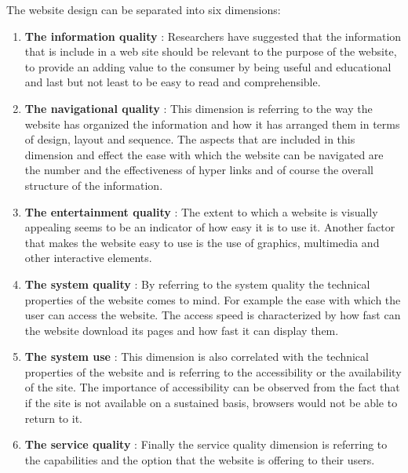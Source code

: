 \documentclass{book}
\begin{document}
The website design can be separated into six dimensions\cite{key9}:
\begin{enumerate}
\item \textbf{The information quality} : Researchers have suggested that the information that is include in a web site should be relevant to the purpose of the website\cite{key14, key16}, to provide an adding value to the consumer by being useful and educational\cite{key18} and last but not least to be easy to read and comprehensible.\cite{key19}
\item \textbf{The navigational quality} : This dimension is referring to the way the website has organized the information and how it has arranged them in terms of design, layout and sequence. The aspects that are included in this dimension and effect the ease with which the website can be navigated are the number and the effectiveness of hyper links and of course the overall structure of the information.\cite{key11,key20,key23,key24,key25}
\item \textbf{The entertainment quality} : The extent to which a website is visually appealing\cite{key19,key25} seems to be an indicator of how easy it is to use it. Another factor that makes the website easy to use is the use of graphics, multimedia and other interactive elements.\cite{key12}
\item \textbf{The system quality} : By referring to the system quality the technical properties of the website comes to mind. For example the ease with which the user can access the website. The access speed is characterized by how fast can the website download its pages and how fast it can display them.\cite{key19,key3,key22}
\item \textbf{The system use} : This dimension is also correlated with the technical properties of the website and is referring to the accessibility or the availability of the site.\cite{key24} The importance of accessibility can be observed from the fact that if the site is not available on a sustained basis, browsers would not be able to return to it.
\item \textbf{The service quality} : Finally the service quality dimension is referring to the capabilities and the option that the website is offering to their users.
\end{enumerate} 
\end{document}
